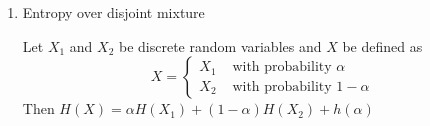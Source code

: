 \documentclass{article}
\begin{document}
\appendix
\begin{enumerate}
    \item Entropy over disjoint mixture
    
    Let $X_1$ and $X_2$ be discrete random variables and $X$ be defined as 
    $$
    X = \begin{cases}
        X_1 & \text{ with probability } \alpha \\
        X_2 & \text{ with probability } 1 - \alpha 
    \end{cases}
    $$
    Then $H(X) = \alpha H(X_1) + (1-\alpha) H(X_2) + h(\alpha)$

\end{enumerate}
\end{document}
